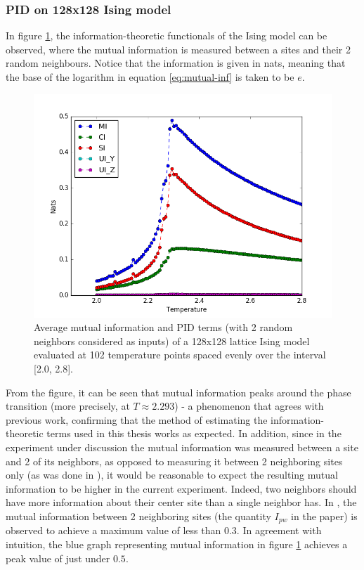 \documentclass[12pt]{article}
\begin{document}
\subsubsection{PID on 128x128 Ising model}

In figure \ref{fig:ising-128-pid-2-nbs}, the information-theoretic functionals of the Ising model can be observed, where the mutual information is measured between a sites and their 2 random neighbours. Notice that the information is given in nats, meaning that the base of the logarithm in equation \ref{eq:mutual-inf} is taken to be $e$. 

\begin{figure} [h!]
\begin{center}
\includegraphics[width=\textwidth]{ising-128-pid-2-nbs}
\caption{Average mutual information and PID terms (with 2 random neighbors considered as inputs) of a 128x128 lattice Ising model evaluated at 102 temperature points spaced evenly over the interval [2.0, 2.8].}
\label{fig:ising-128-pid-2-nbs}
\end{center}
\end{figure}

From the figure, it can be seen that mutual information peaks around the phase transition (more precisely, at $T \approx 2.293$) - a phenomenon that agrees with previous work, confirming that the method of estimating the information-theoretic terms used in this thesis works as expected. In addition, since in the experiment under discussion the mutual information was measured between a site and 2 of its neighbors, as opposed to measuring it between 2 neighboring sites only (as was done in \cite{barnett-ising}), it would be reasonable to expect the resulting mutual information to be higher in the current experiment. Indeed, two neighbors should have more information about their center site than a single neighbor has. In \cite{barnett-ising}, the mutual information between 2 neighboring sites (the quantity $I_{pw}$ in the paper) is observed to achieve a maximum value of less than $0.3$. In agreement with intuition, the blue graph representing mutual information in figure \ref{fig:ising-128-pid-2-nbs} achieves a peak value of just under $0.5$.
\end{document}

